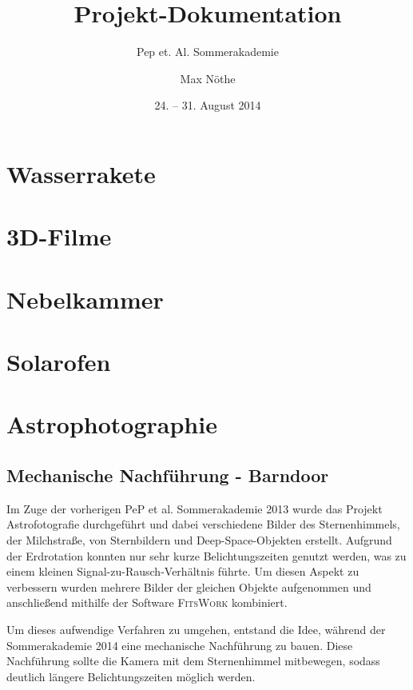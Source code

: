 

\title{Projekt-Dokumentation}
\subtitle{Pep et. Al. Sommerakademie}
\date{24. -- 31. August 2014}

\author{Max Nöthe}




\maketitle
\tableofcontents

\section{Wasserrakete}
\blindtext
\section{3D-Filme}
\blindtext
\section{Nebelkammer}
\blindtext
\section{Solarofen}
\blindtext

\section{Astrophotographie}

\subsection*{Mechanische Nachführung - Barndoor}

Im Zuge der vorherigen PeP et al. Sommerakademie 2013 wurde das Projekt
Astrofotografie durchgeführt und dabei verschiedene Bilder des Sternenhimmels,
der Milchstraße, von Sternbildern und Deep-Space-Objekten erstellt. Aufgrund der
Erdrotation konnten nur sehr kurze Belichtungszeiten genutzt werden, was zu
einem kleinen Signal-zu-Rausch-Verhältnis führte. Um diesen Aspekt zu verbessern
wurden mehrere Bilder der gleichen Objekte aufgenommen und anschließend mithilfe
der Software \textsc{FitsWork} kombiniert.

Um dieses aufwendige Verfahren zu umgehen, entstand die Idee, während der
Sommerakademie 2014 eine mechanische Nachführung zu bauen. Diese Nachführung
sollte die Kamera mit dem Sternenhimmel mitbewegen, sodass deutlich längere
Belichtungszeiten möglich werden.

